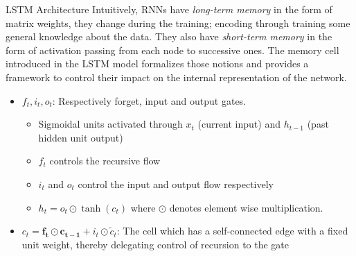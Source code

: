 \documentclass[final]{beamer}
\newlength{\colwidth}
\begin{document}
\begin{frame}[t]
\begin{columns}[t]
\begin{column}{\colwidth}
\begin{block}{LSTM Architecture}
Intuitively, RNNs have \textit{long-term memory} in the form of matrix weights,
they change during the training; encoding through training some general
knowledge about the data. They also have \textit{short-term memory} in the form
of activation passing from each node to successive ones. The memory cell
introduced in the LSTM model formalizes those notions and provides a framework
to control their impact on the internal representation of the network.
\begin{center}
    \begin{itemize}
    \item $f_t, i_t, o_t$: Respectively forget, input and output gates.
        \begin{itemize}
            \normalsize
            \item Sigmoidal units activated through  $x_t$ (current input) and
                $h_{t-1}$ (past hidden unit output) \item $f_t$ controls the
                recursive flow
            \item $i_t$ and $o_t$ control the input and output flow
                respectively
            \item $h_t = o_t \odot \tanh(c_t)$ where $\odot$ denotes element
                wise multiplication.
        \end{itemize}
    \item $c_t = \mathbf{f_t \odot c_{t-1}} + i_t \odot \tilde{c}_t$: The cell
    which has a self-connected edge with a fixed unit weight, thereby delegating
    control of recursion to the gate \end{itemize}
\end{center}

\end{block}


\end{column}
\end{columns}
\end{frame}
\end{document}
